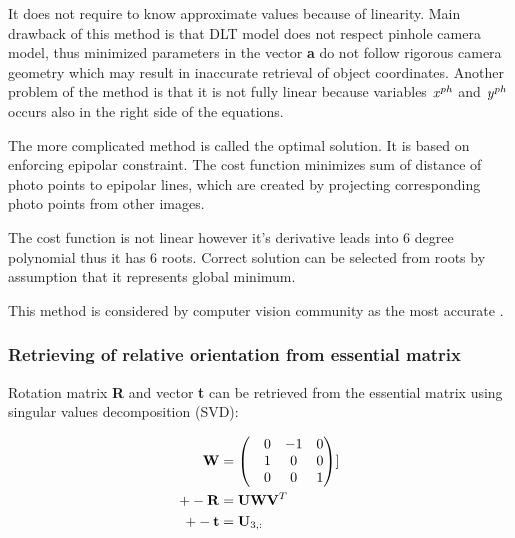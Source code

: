 \documentclass[a4paper,12pt]{article}
\newcommand{\ematr}[1]{
{\bf #1}
}
\newcommand{\evect}[1]{
{\bf #1}
}
\newcommand{\escal}[1]{
{\it #1}
}
\begin{document}

It does not require to know approximate values because of linearity. 
Main drawback of this method is that DLT model does not respect pinhole camera model, thus
minimized parameters in the vector \evect{a} do not follow rigorous camera geometry which 
may result in inaccurate retrieval of object coordinates. Another problem of the method 
is that it is not fully linear because variables $\escal{x}^{ph}$ and $\escal{y}^{ph}$
occurs also in the right side of the equations. 


The more complicated method is called the optimal solution. 
It is based on enforcing epipolar constraint.  The cost function 
minimizes sum of distance of photo points to epipolar lines, which are created 
by projecting corresponding photo points from other images.

The cost function is not linear however it's derivative leads into 6 degree polynomial thus 
it has 6 roots. Correct solution can be selected from roots by assumption that it represents global minimum. 

This method is considered by computer vision community as the most accurate \cite[p. 315]{Hartley2004}.  

\subsubsection{Retrieving of relative orientation from essential matrix}
\label{sec:ess_eo}



Rotation matrix \ematr{R} and vector \evect{t} can be retrieved from the essential matrix using 
singular values decomposition (SVD):


\begin{equation}
\begin{split}
\ematr{W} &=
\begin{pmatrix}
& 0 & -1 & 0 \\
& 1 & 0 & 0 \\
& 0 & 0 & 1\\
\end{pmatrix}] \\
+- \ematr{R} &= \ematr{U}  \ematr{W} \ematr{V}^{T}\\
+- \evect{t} &= \evect{U}_{3,:}
\end{split}
\end{equation}
\end{document}
